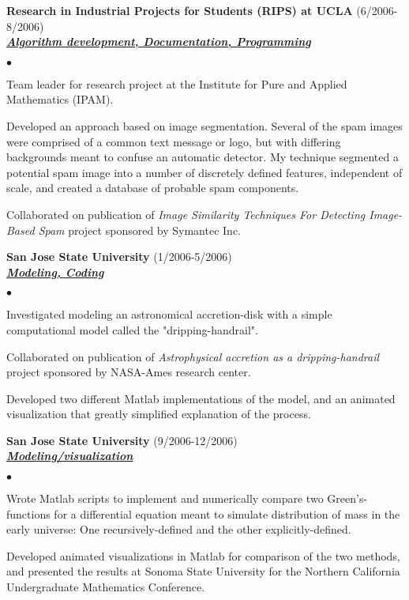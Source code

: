 \documentclass{article}
\newcommand{\employer}[3]{{ \textbf{#1} (#2)\\ \underline{\textbf{\emph{#3}}}\\  }}
\newenvironment{achievements}{\begin{list}{$\bullet$}{\topsep 0pt \itemsep -2pt}}{\vspace*{4pt}\end{list}}
\begin{document}
\employer{Research in Industrial Projects for Students (RIPS) at UCLA}{6/2006-8/2006}{Algorithm development, Documentation, Programming}
	\begin{achievements}
	\item Team leader for research project at the Institute for Pure and Applied Mathematics (IPAM).
	\item Developed an approach based on image segmentation. Several of the spam images were comprised of a common text message or logo, but with differing backgrounds meant to confuse an automatic detector. My technique segmented a potential spam image into a number of discretely defined features, independent of scale, and created a database of probable spam components.
	\item Collaborated on publication of \emph{Image Similarity Techniques For Detecting Image-Based Spam} project sponsored by Symantec Inc.

	\end{achievements}

\employer{San Jose State University}{1/2006-5/2006}{Modeling, Coding}
	\begin{achievements}
     \item Investigated modeling an astronomical accretion-disk with a simple computational model called the "dripping-handrail".
	\item Collaborated on publication of \emph{Astrophysical accretion as a dripping-handrail} project sponsored by NASA-Ames research center.
	\item Developed two different Matlab implementations of the model, and an animated visualization that greatly simplified explanation of the process.
	\end{achievements}

\employer{San Jose State University}{9/2006-12/2006}{Modeling/visualization}
	\begin{achievements}
	\item Wrote Matlab scripts to implement and numerically compare two Green's-functions for a differential equation meant to simulate distribution of mass in the early universe: One recursively-defined and the other explicitly-defined.

	\item Developed animated visualizations in Matlab for comparison of the two methods, and presented the results at Sonoma State University for the Northern California Undergraduate Mathematics Conference.
	\end{achievements}
\end{document}
